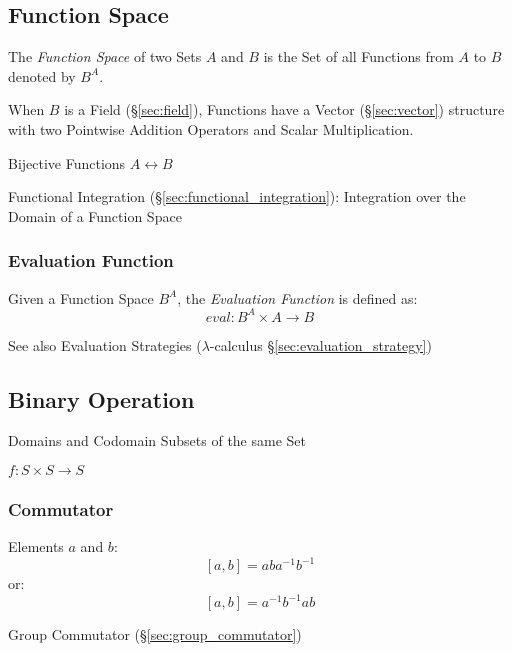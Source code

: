 \subsection{Function Space}\label{sec:function_space}

The \emph{Function Space} of two Sets $A$ and $B$ is the Set of all
Functions from $A$ to $B$ denoted by $B^A$.

When $B$ is a Field (\S\ref{sec:field}), Functions have a Vector
(\S\ref{sec:vector}) structure with two Pointwise Addition Operators
and Scalar Multiplication. %

Bijective Functions $A \leftrightarrow B$

\fist Functional Integration (\S\ref{sec:functional_integration}): Integration
over the Domain of a Function Space



\subsubsection{Evaluation Function}\label{sec:evaluation_function}

Given a Function Space $B^A$, the \emph{Evaluation Function} is
defined as:
\[
  eval : B^A \times A \rightarrow B
\]

\fist See also Evaluation Strategies ($\lambda$-calculus
\S\ref{sec:evaluation_strategy})



\subsection{Binary Operation}\label{sec:binary_operation}

Domains and Codomain Subsets of the same Set

$f : S \times S \rightarrow S$



\subsubsection{Commutator}\label{sec:commutator}

Elements $a$ and $b$:
\[
  [a,b] = aba^{-1}b^{-1}
\]
or:
\[
  [a,b] = a^{-1}b^{-1}ab
\]

Group Commutator (\S\ref{sec:group_commutator})



